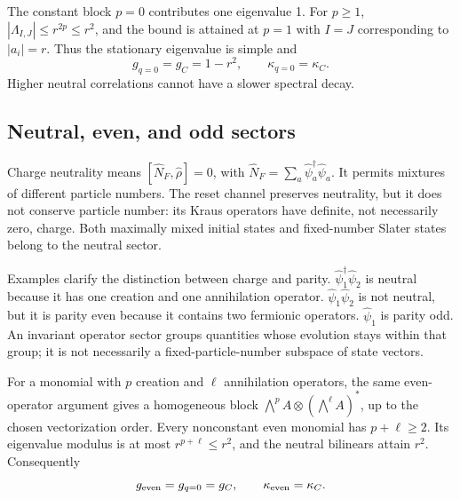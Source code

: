\documentclass[aps,prb,onecolumn,nofootinbib,superscriptaddress,floatfix]{revtex4-2}
\begin{document}
The constant block $p=0$ contributes one eigenvalue 1. For $p\ge1$,
$|\Lambda_{I,J}|\le r^{2p}\le r^2$, and the bound is attained at
$p=1$ with $I=J$ corresponding to $|a_i|=r$. Thus the stationary
eigenvalue is simple and
\begin{equation}
 \boxed{g_{q=0}=g_C=1-r^2,\qquad \kappa_{q=0}=\kappa_C.}
 \label{eq:neutral}
\end{equation}
Higher neutral correlations cannot have a slower spectral decay.

\subsection{Neutral, even, and odd sectors}
Charge neutrality means $[\hat N_F,\hat\rho]=0$, with
$\hat N_F=\sum_a\hat\psi_a^\dagger\hat\psi_a$.
It permits mixtures of different particle numbers. The reset channel
preserves neutrality, but it does not conserve particle number:
its Kraus operators have definite, not necessarily zero, charge.
Both maximally mixed initial states and fixed-number Slater states
belong to the neutral sector.

Examples clarify the distinction between charge and parity.
$\hat\psi_1^\dagger\hat\psi_2$ is neutral because it has one
creation and one annihilation operator.
$\hat\psi_1\hat\psi_2$ is not neutral, but it is parity even
because it contains two fermionic operators.
$\hat\psi_1$ is parity odd.
An invariant operator sector groups quantities whose evolution
stays within that group; it is not necessarily a fixed-particle-number
subspace of state vectors.

For a monomial with $p$ creation and $\ell$ annihilation operators,
the same even-operator argument gives a homogeneous block
$\bigwedge^p A\otimes(\bigwedge^\ell A)^*$, up to the chosen
vectorization order. Every nonconstant even monomial has
$p+\ell\ge2$. Its eigenvalue modulus is at most $r^{p+\ell}\le r^2$,
and the neutral bilinears attain $r^2$. Consequently
\begin{equation}
 g_{\rm even}=g_{q=0}=g_C,\qquad
 \kappa_{\rm even}=\kappa_C. \label{eq:even}
\end{equation}
\end{document}
